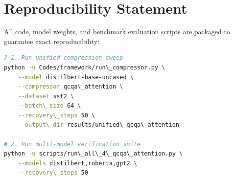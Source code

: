 \section{Reproducibility Statement}
All code, model weights, and benchmark evaluation scripts are packaged to guarantee exact reproducibility:
\begin{lstlisting}[language=bash]
# 1. Run unified compression sweep
python -u Codes/framework/run\_compressor.py \
    --model distilbert-base-uncased \
    --compressor qcqa\_attention \
    --dataset sst2 \
    --batch\_size 64 \
    --recovery\_steps 50 \
    --output\_dir results/unified\_qcqa\_attention

# 2. Run multi-model verification suite
python -u scripts/run\_all\_4\_qcqa\_attention.py \
    --models distilbert,roberta,gpt2 \
    --recovery\_steps 50
\end{lstlisting}

